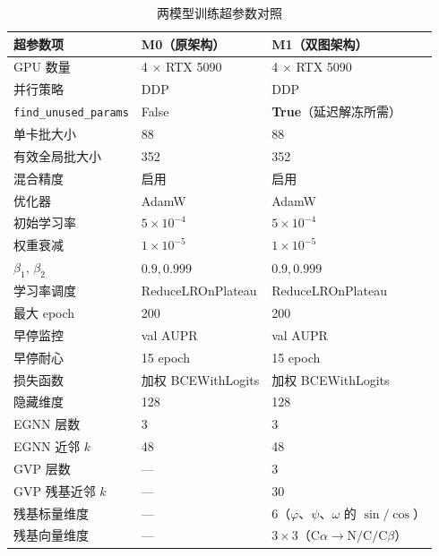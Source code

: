 \begin{table}[htbp]
  \centering
  \caption{两模型训练超参数对照}
  \label{tab:app-hparams}
  \begin{tabular}{lll}
    \toprule
    超参数项 & M0（原架构）& M1（双图架构）\\
    \midrule
    GPU 数量            & 4 $\times$ RTX 5090 & 4 $\times$ RTX 5090 \\
    并行策略            & DDP                  & DDP \\
    \texttt{find\_unused\_params} & False      & \textbf{True}（延迟解冻所需）\\
    单卡批大小          & 88                   & 88 \\
    有效全局批大小      & 352                  & 352 \\
    混合精度            & 启用                 & 启用 \\
    优化器              & AdamW                & AdamW \\
    初始学习率          & $5 \times 10^{-4}$   & $5 \times 10^{-4}$ \\
    权重衰减            & $1 \times 10^{-5}$   & $1 \times 10^{-5}$ \\
    $\beta_1$, $\beta_2$ & $0.9, 0.999$        & $0.9, 0.999$ \\
    学习率调度          & ReduceLROnPlateau    & ReduceLROnPlateau \\
    最大 epoch          & 200                  & 200 \\
    早停监控            & val AUPR             & val AUPR \\
    早停耐心            & 15 epoch             & 15 epoch \\
    损失函数            & 加权 BCEWithLogits   & 加权 BCEWithLogits \\
    \midrule
    隐藏维度            & 128                  & 128 \\
    EGNN 层数           & 3                    & 3 \\
    EGNN 近邻 $k$       & 48                   & 48 \\
    GVP 层数            & ---                  & 3 \\
    GVP 残基近邻 $k$    & ---                  & 30 \\
    残基标量维度        & ---                  & 6（$\varphi$、$\psi$、$\omega$ 的 $\sin/\cos$）\\
    残基向量维度        & ---                  & $3 \times 3$（$\mathrm{C}\alpha \to \mathrm{N}/\mathrm{C}/\mathrm{C}\beta$）\\

\end{tabular}
\end{table}
